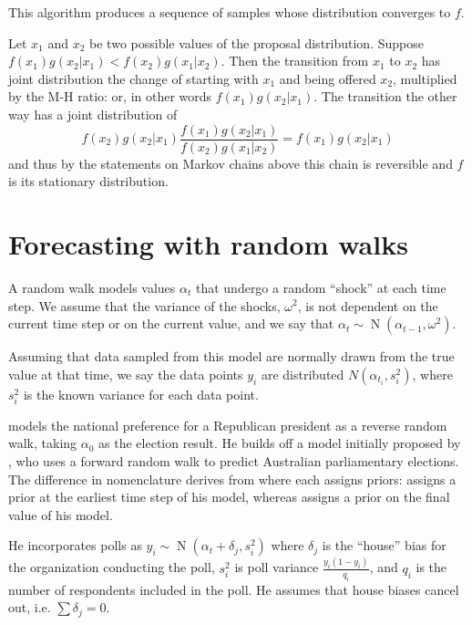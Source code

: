 \documentclass[12pt]{report}
\DeclareMathOperator{\N}{N}
\begin{document}
This algorithm produces a sequence of samples whose distribution converges to $f$.

Let $x_1$ and $x_2$ be two possible values of the proposal distribution. Suppose $f(x_1)g(x_2|x_1) < f(x_2)g(x_1|x_2)$. Then the transition from $x_1$ to $x_2$ has joint distribution the change of starting with $x_1$ and being offered $x_2$, multiplied by the M-H ratio: or, in other words $f(x_1)g(x_2|x_1)$. The transition the other way has a joint distribution of \[ f(x_2)g(x_2|x_1)\dfrac{f(x_1)g(x_2|x_1)}{f(x_2)g(x_1|x_2)} = f(x_1)g(x_2|x_1)\]
and thus by the statements on Markov chains above this chain is reversible and $f$ is its stationary distribution.



\setcounter{chapter}{9}
\chapter{Forecasting with random walks}

A random walk models values $\alpha_t$ that undergo a random ``shock'' at each time step. We assume that the variance of the shocks, $\omega^2$, is not dependent on the current time step or on the current value, and we say that \( \alpha_t \sim \N(\alpha_{t-1}, \omega^2) \).

Assuming that data sampled from this model are normally drawn from the true value at that time, we say the data points $y_i$ are distributed $ N(\alpha_{t_i}, s^2_i)$, where $s^2_i$ is the known variance for each data point.

\citet{Strauss:2007aa} models the national preference for a Republican president as a reverse random walk, taking $\alpha_0$ as the election result. He builds off a model initially proposed by \citet{Jackman:2005aa}, who uses a forward random walk to predict Australian parliamentary elections. The difference in nomenclature derives from where each assigns priors: \citet{Jackman:2005aa} assigns a prior at the earliest time step of his model, whereas \citet{Strauss:2007aa} assigns a prior on the final value of his model.


He incorporates polls as \(y_i \sim \N(\alpha_t + \delta_j, s_i^2)\) where $\delta_j$ is the ``house'' bias for the organization conducting the poll, $s_i^2$ is poll variance $\frac{y_i(1-y_i)}{q_i}$, and $q_i$ is the number of respondents included in the poll. He assumes that house biases cancel out, i.e. $\sum \delta_j = 0$.
\end{document}
